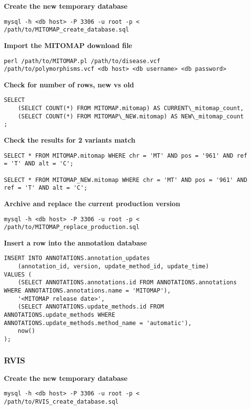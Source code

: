 \documentclass[11pt, a4paper]{article}
\begin{document}
\textbf{Create the new temporary database}

\texttt{mysql -h <db host> -P 3306 -u root -p < /path/to/MITOMAP\_create\_database.sql}

\textbf{Import the MITOMAP download file}

\texttt{perl /path/to/MITOMAP.pl /path/to/disease.vcf /path/to/polymorphisms.vcf <db host> <db username> <db password>}

\textbf{Check for number of rows, new vs old}

\begin{lstlisting}
SELECT 
	(SELECT COUNT(*) FROM MITOMAP.mitomap) AS CURRENT\_mitomap_count,
	(SELECT COUNT(*) FROM MITOMAP\_NEW.mitomap) AS NEW\_mitomap_count
;
\end{lstlisting}

\textbf{Check the results for 2 variants match}

\begin{lstlisting}
SELECT * FROM MITOMAP.mitomap WHERE chr = 'MT' AND pos = '961' AND ref = 'T' AND alt = 'C';

SELECT * FROM MITOMAP_NEW.mitomap WHERE chr = 'MT' AND pos = '961' AND ref = 'T' AND alt = 'C';
\end{lstlisting}

\textbf{Archive and replace the current production version}

\texttt{mysql -h <db host> -P 3306 -u root -p < /path/to/MITOMAP\_replace\_production.sql}

\textbf{Insert a row into the annotation database}

\begin{lstlisting}
INSERT INTO ANNOTATIONS.annotation_updates 
	(annotation_id, version, update_method_id, update_time)
VALUES (
	(SELECT ANNOTATIONS.annotations.id FROM ANNOTATIONS.annotations WHERE ANNOTATIONS.annotations.name = 'MITOMAP'),
	'<MITOMAP release date>',
	(SELECT ANNOTATIONS.update_methods.id FROM ANNOTATIONS.update_methods WHERE ANNOTATIONS.update_methods.method_name = 'automatic'),
	now()
);
\end{lstlisting}

\subsubsection{RVIS}

\textbf{Create the new temporary database}

\texttt{mysql -h <db host> -P 3306 -u root -p < /path/to/RVIS\_create\_database.sql}
\end{document}
